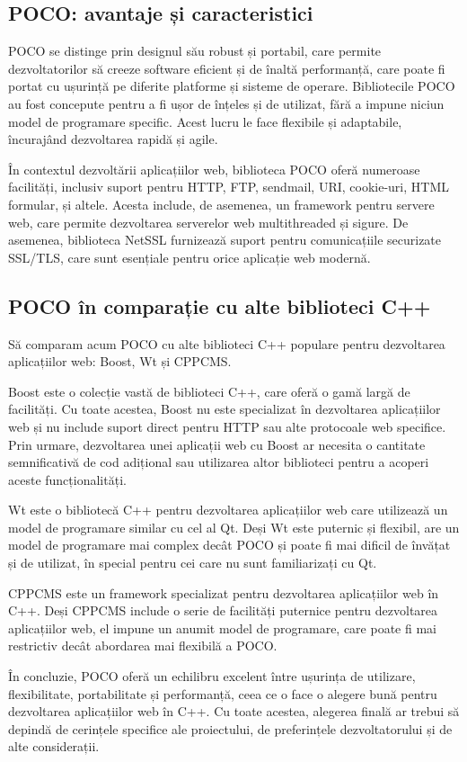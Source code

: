 \subsection{POCO: avantaje și caracteristici}

POCO se distinge prin designul său robust și portabil, care permite dezvoltatorilor să creeze software eficient și de înaltă performanță, care poate fi portat cu ușurință pe diferite platforme și sisteme de operare. Bibliotecile POCO au fost concepute pentru a fi ușor de înțeles și de utilizat, fără a impune niciun model de programare specific. Acest lucru le face flexibile și adaptabile, încurajând dezvoltarea rapidă și agile.

În contextul dezvoltării aplicațiilor web, biblioteca POCO oferă numeroase facilități, inclusiv suport pentru HTTP, FTP, sendmail, URI, cookie-uri, HTML formular, și altele. Acesta include, de asemenea, un framework pentru servere web, care permite dezvoltarea serverelor web multithreaded și sigure. De asemenea, biblioteca NetSSL furnizează suport pentru comunicațiile securizate SSL/TLS, care sunt esențiale pentru orice aplicație web modernă.

\subsection{POCO în comparație cu alte biblioteci C++}

Să comparam acum POCO cu alte biblioteci C++ populare pentru dezvoltarea aplicațiilor web: Boost, Wt și CPPCMS.

Boost este o colecție vastă de biblioteci C++, care oferă o gamă largă de facilități. Cu toate acestea, Boost nu este specializat în dezvoltarea aplicațiilor web și nu include suport direct pentru HTTP sau alte protocoale web specifice. Prin urmare, dezvoltarea unei aplicații web cu Boost ar necesita o cantitate semnificativă de cod adițional sau utilizarea altor biblioteci pentru a acoperi aceste funcționalități.

Wt este o bibliotecă C++ pentru dezvoltarea aplicațiilor web care utilizează un model de programare similar cu cel al Qt. Deși Wt este puternic și flexibil, are un model de programare mai complex decât POCO și poate fi mai dificil de învățat și de utilizat, în special pentru cei care nu sunt familiarizați cu Qt.

CPPCMS este un framework specializat pentru dezvoltarea aplicațiilor web în C++. Deși CPPCMS include o serie de facilități puternice pentru dezvoltarea aplicațiilor web, el impune un anumit model de programare, care poate fi mai restrictiv decât abordarea mai flexibilă a POCO.

În concluzie, POCO oferă un echilibru excelent între ușurința de utilizare, flexibilitate, portabilitate și performanță, ceea ce o face o alegere bună pentru dezvoltarea aplicațiilor web în C++. Cu toate acestea, alegerea finală ar trebui să depindă de cerințele specifice ale proiectului, de preferințele dezvoltatorului și de alte considerații.
